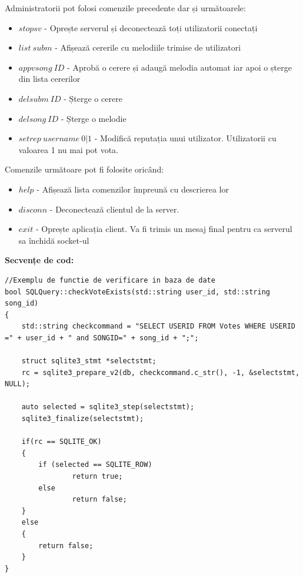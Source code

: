 \documentclass{article}
\begin{document}
Administratorii pot folosi comenzile precedente dar și următoarele:
\begin{itemize}
\item $stopsv$ - Oprește serverul și deconectează toți utilizatorii conectați
\item $list\ subm$ - Afișează cererile cu melodiile trimise de utilizatori
\item $appvsong\ ID$ - Aprobă o cerere și adaugă melodia automat iar apoi o șterge din lista cererilor
\item $delsubm\ ID$ - Șterge o cerere
\item $delsong\ ID$ - Șterge o melodie
\item $setrep\ username\ 0|1$ - Modifică reputația unui utilizator. Utilizatorii cu valoarea 1 nu mai pot vota.
\end{itemize}

Comenzile următoare pot fi folosite oricând:
\begin{itemize}
\item $help$ - Afișează lista comenzilor împreună cu descrierea lor
\item $disconn$ - Deconectează clientul de la server.
\item $exit$ - Oprește aplicația client. Va fi trimis un mesaj final pentru ca serverul sa închidă socket-ul
\end{itemize}

\pagebreak
\textbf{Secvențe de cod:}
\begin{lstlisting}
//Exemplu de functie de verificare in baza de date
bool SQLQuery::checkVoteExists(std::string user_id, std::string song_id)
{
    std::string checkcommand = "SELECT USERID FROM Votes WHERE USERID =" + user_id + " and SONGID=" + song_id + ";";

    struct sqlite3_stmt *selectstmt;
    rc = sqlite3_prepare_v2(db, checkcommand.c_str(), -1, &selectstmt, NULL);
    
    auto selected = sqlite3_step(selectstmt);
    sqlite3_finalize(selectstmt);
    
    if(rc == SQLITE_OK)
    {
        if (selected == SQLITE_ROW)
                return true; 
        else 
                return false;
    }
    else
    {
        return false;
    }
}
\end{lstlisting}
\end{document}
